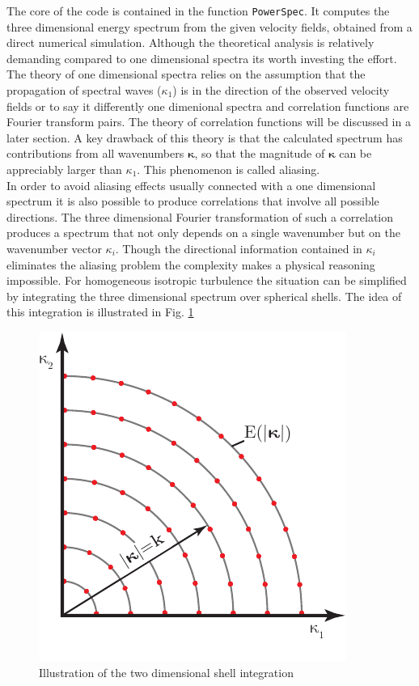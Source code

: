 \documentclass[preprint,12pt,ntfdMod]{elsarticle}
\begin{document}
\begin{par}

The core of the code is contained in the function
\lstinline!PowerSpec!. It computes the three dimensional energy spectrum
from the given velocity fields, obtained from a direct numerical
simulation. Although the theoretical analysis is
relatively demanding compared to one dimensional spectra its worth
investing the effort. The theory of one dimensional spectra relies
on the assumption that the propagation of spectral waves ($\kappa_1$)
is in the
direction of the observed velocity fields or to say it differently one
dimenional spectra and correlation functions are Fourier transform pairs.
The theory of correlation functions will be discussed in a later section.
A key drawback of this theory is that the calculated spectrum has
contributions from all wavenumbers $\boldsymbol\kappa$, so that the
magnitude of $\boldsymbol\kappa$ can be appreciably larger than
$\kappa_1$. This phenomenon is called aliasing.\\
In order to avoid aliasing effects usually connected with a one
dimensional spectrum it is also possible to produce correlations that
involve all possible directions. The three dimensional Fourier
transformation of such a correlation produces a spectrum that not only
depends on a single wavenumber but on the wavenumber vector $\kappa_i$.
Though the directional information contained in $\kappa_i$ eliminates the
aliasing problem the complexity makes a physical reasoning impossible.
For homogeneous isotropic turbulence the situation can be simplified by
integrating the three dimensional spectrum over spherical shells. The
idea of this integration is illustrated in Fig. \ref{fig:shell_int}
\begin{figure}
  \centering
  \includegraphics[scale=1]{shell_integration}
  \caption{Illustration of the two dimensional shell integration}
  \label{fig:shell_int}
\end{figure}

\end{par} \vspace{1em}
\end{document}
